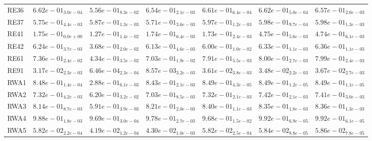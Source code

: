 \documentclass{article}
\begin{document}
\begin{table}
\begin{scriptsize}
\begin{tabular}{lllllll}
RE36 & \cellcolor{gray95}$  6.62e-01_{ 3.0e-04}$ & $  5.56e-01_{ 8.3e-02}$ & $  6.54e-01_{ 2.1e-03}$ & $  6.61e-01_{ 6.4e-04}$ & \cellcolor{gray25}$  6.62e-01_{ 5.0e-04}$ & $  6.57e-01_{ 2.0e-03}$ \\
RE37 & $  5.75e-01_{ 4.4e-03}$ & $  5.87e-01_{ 1.3e-03}$ & $  5.71e-01_{ 3.6e-03}$ & $  5.97e-01_{ 1.2e-03}$ & \cellcolor{gray95}$  5.98e-01_{ 9.7e-04}$ & \cellcolor{gray25}$  5.98e-01_{ 1.3e-03}$ \\
RE41 & $  1.75e-01_{ 0.0e+00}$ & $  1.27e-01_{ 1.4e-02}$ & $  1.74e-01_{ 6.4e-03}$ & $  1.73e-01_{ 2.4e-03}$ & \cellcolor{gray95}$  4.75e-01_{ 5.6e-03}$ & \cellcolor{gray25}$  4.74e-01_{ 6.1e-03}$ \\
RE42 & $  6.24e-01_{ 3.7e-03}$ & $  3.68e-01_{ 2.0e-02}$ & $  6.13e-01_{ 4.6e-03}$ & $  6.00e-01_{ 1.0e-02}$ & \cellcolor{gray25}$  6.33e-01_{ 1.1e-03}$ & \cellcolor{gray95}$  6.36e-01_{ 1.1e-03}$ \\
RE61 & $  7.36e-01_{ 2.4e-02}$ & $  4.34e-01_{ 3.5e-02}$ & $  7.03e-01_{ 1.9e-02}$ & $  7.91e-01_{ 5.5e-03}$ & \cellcolor{gray95}$  8.00e-01_{ 2.7e-03}$ & \cellcolor{gray25}$  7.99e-01_{ 2.4e-03}$ \\
RE91 & $  3.17e-02_{ 2.3e-03}$ & $  6.46e-04_{ 2.3e-04}$ & $  8.57e-03_{ 3.2e-03}$ & \cellcolor{gray25}$  3.61e-02_{ 3.8e-03}$ & $  3.48e-02_{ 2.2e-03}$ & \cellcolor{gray95}$  3.67e-02_{ 2.7e-03}$ \\
RWA1 & $  8.48e-01_{ 1.4e-04}$ & $  2.88e-01_{ 6.1e-03}$ & $  8.43e-01_{ 2.1e-03}$ & $  8.49e-01_{ 4.3e-05}$ & \cellcolor{gray25}$  8.49e-01_{ 1.2e-05}$ & \cellcolor{gray95}$  8.49e-01_{ 1.1e-05}$ \\
RWA2 & $  7.32e-01_{ 4.2e-03}$ & $  6.20e-01_{ 3.2e-02}$ & $  7.03e-01_{ 8.5e-03}$ & $  7.32e-01_{ 2.1e-03}$ & \cellcolor{gray95}$  7.42e-01_{ 2.1e-03}$ & \cellcolor{gray25}$  7.41e-01_{ 3.0e-03}$ \\
RWA3 & $  8.14e-01_{ 8.7e-03}$ & $  5.91e-01_{ 3.9e-03}$ & $  8.21e-01_{ 2.0e-03}$ & \cellcolor{gray95}$  8.40e-01_{ 1.1e-03}$ & $  8.35e-01_{ 1.8e-03}$ & \cellcolor{gray25}$  8.36e-01_{ 1.3e-03}$ \\
RWA4 & $  9.88e-01_{ 1.8e-03}$ & $  9.69e-01_{ 3.0e-04}$ & $  9.78e-01_{ 2.7e-03}$ & $  9.68e-01_{ 1.5e-02}$ & \cellcolor{gray25}$  9.92e-01_{ 6.9e-05}$ & \cellcolor{gray95}$  9.92e-01_{ 6.1e-05}$ \\
RWA5 & $  5.82e-02_{ 2.2e-04}$ & $  4.19e-02_{ 1.2e-04}$ & $  4.30e-02_{ 1.0e-03}$ & $  5.82e-02_{ 2.5e-04}$ & \cellcolor{gray25}$  5.84e-02_{ 8.8e-05}$ & \cellcolor{gray95}$  5.86e-02_{ 7.8e-05}$ \\

\end{tabular}
\end{scriptsize}
\end{table}
\end{document}
